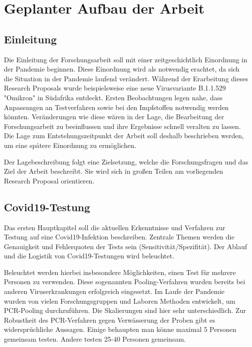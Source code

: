 
\chapter{Geplanter Aufbau der Arbeit}
\section{Einleitung}
Die Einleitung der Forschungsarbeit soll mit einer zeitgeschichtlich Einordnung in der Pandemie beginnen.
Diese Einordnung wird als notwendig erachtet, da sich die Situation in der Pandemie laufend verändert.
Während der Erarbeitung dieses Research Proposals wurde beispielsweise eine neue Virusvariante B.1.1.529 "Omikron" in Südafrika entdeckt.
Ersten Beobachtungen legen nahe, dass Anpassungen an Testverfahren sowie bei den Impfstoffen notwendig werden könnten.
Veränderungen wie diese wären in der Lage, die Bearbeitung der Forschungsarbeit zu beeinflussen und ihre Ergebnisse schnell veralten zu lassen.
Die Lage zum Entstehungszeitpunkt der Arbeit soll deshalb beschrieben werden, um eine spätere Einordnung zu ermöglichen.

Der Lagebeschreibung folgt eine Zielsetzung, welche die Forschungsfragen und das Ziel der Arbeit beschreibt.
Sie wird sich in großen Teilen am vorliegenden Research Proposal orientieren.

\section{Covid19-Testung}
Das ersten Hauptkapitel soll die aktuellen Erkenntnisse und Verfahren zur Testung auf eine Covid19-Infektion beschreiben.
Zentrale Themen werden die Genauigkeit und Fehlerquoten der Tests sein (Sensitivität/Spezifität).
Der Ablauf und die Logistik von Covid19-Testungen wird beleuchtet.

Beleuchtet werden hierbei insbesondere Möglichkeiten, einen Test für mehrere Personen zu verwenden.
Diese sogenannten Pooling-Verfahren wurden bereits bei anderen Viruserkrankungen erfolgreich eingesetzt.
\cite{Ärzteblatt}
Im Laufe der Pandemie wurden von vielen Forschungsgruppen und Laboren Methoden entwickelt, um PCR-Pooling durchzuführen.
Die Skalierungen sind hier sehr unterschiedlich.
Zur Robustheit des PCR-Verfahren gegen Verwässerung der Proben gibt es widersprüchliche Aussagen.
Einige behaupten man könne maximal 5 Personen gemeinsam testen.
\cite{Quelle}
Andere testen 25-40 Personen gemeinsam.
\cite{Quelle}

